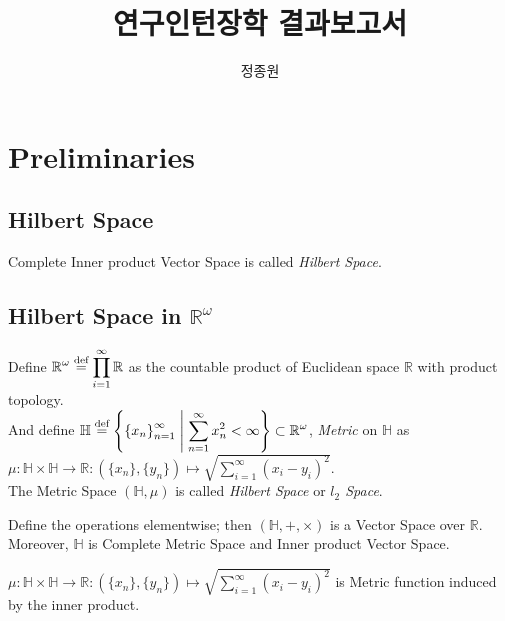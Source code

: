 \documentclass[11pt]{article}
\title{연구인턴장학 결과보고서}
\author{정종원}
\affil{서울시립대학교 수학과}
\date{}
\theoremstyle{romanstyle}
\newcommand{\dis}{\displaystyle}
\newcommand{\defequal}{\overset{\textnormal{def}}{=}}
\begin{document}
\maketitle


\section{Preliminaries}

\subsection{Hilbert Space}
\begin{definition}
    Complete Inner product Vector Space is called \textit{Hilbert Space}.
\end{definition}

\subsection{Hilbert Space in $\mathbb{R}^\omega$}
\begin{definition}
    Define $\dis \mathbb{R}^\omega \defequal \prod_{i=1}^\infty \mathbb{R}$ as the countable product of Euclidean space $\mathbb{R}$ with product topology. \\
    And define $\dis \mathbb{H} \defequal \left\{ {\{x_n \}}_{n=1}^\infty \;\middle|\; \sum_{n=1}^{\infty} x^2_n < \infty \right\} \subset \mathbb{R}^\omega$, 
    \textit{Metric} on $\mathbb{H}$ as $\dis \mu:\mathbb{H} \times \mathbb{H} \to \mathbb{R}: ( \{x_n\}, \{y_n\}) \mapsto \sqrt{\sum_{i=1}^{\infty} (x_i - y_i)^2}$.\\
    The Metric Space $(\mathbb{H}, \mu)$ is called \textit{Hilbert Space} or \textit{$l_2$ Space}.    
\end{definition}
Define the operations elementwise; then $(\mathbb{H}, +, \times)$ is a Vector Space over $\mathbb{R}$.\\
Moreover, $\mathbb{H}$ is Complete Metric Space and Inner product Vector Space.
\begin{lemma}
    $\dis \mu:\mathbb{H} \times \mathbb{H} \to \mathbb{R}: ( \{x_n\}, \{y_n\}) \mapsto \sqrt{\sum_{i=1}^{\infty} (x_i - y_i)^2}$
    is Metric function induced by the inner product.
\end{lemma}
\end{document}
